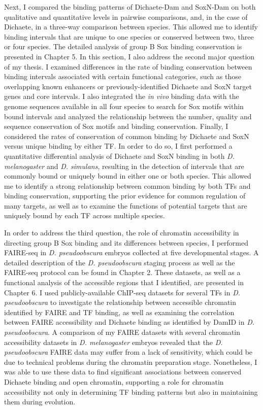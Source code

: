 Next, I compared the binding patterns of Dichaete-Dam and SoxN-Dam on both qualitative and quantitative levels in pairwise comparisons, and, in the case of Dichaete, in a three-way comparison between species. This allowed me to identify binding intervals that are unique to one species or conserved between two, three or four species. The detailed analysis of group B Sox binding conservation is presented in Chapter 5. In this section, I also address the second major question of my thesis. I examined differences in the rate of binding conservation between binding intervals associated with certain functional categories, such as those overlapping known enhancers or previously-identified Dichaete and SoxN target genes and core intervals. I also integrated the \emph{in vivo} binding data with the genome sequences available in all four species to search for Sox motifs within bound intervals and analyzed the relationship between the number, quality and sequence conservation of Sox motifs and binding conservation. Finally, I considered the rates of conservation of common binding by Dichaete and SoxN versus unique binding by either TF. In order to do so, I first performed a quantitative differential analysis of Dichaete and SoxN binding in both \emph{D. melanogaster} and \emph{D. simulans}, resulting in the detection of intervals that are commonly bound or uniquely bound in either one or both species. This allowed me to identify a strong relationship between common binding by both TFs and binding conservation, supporting the prior evidence for common regulation of many targets, as well as to examine the functions of potential targets that are uniquely bound by each TF across multiple species.

In order to address the third question, the role of chromatin accessibility in directing group B Sox binding and its differences between species, I performed FAIRE-seq in \emph{D. pseudoobscura} embryos collected at five developmental stages. A detailed description of the \emph{D. pseudoobscura} staging process as well as the FAIRE-seq protocol can be found in Chapter 2. These datasets, as well as a functional analysis of the accessible regions that I identified, are presented in Chapter 6. I used publicly-available ChIP-seq datasets for several TFs in \emph{D. pseudoobscura} to investigate the relationship between accessible chromatin identified by FAIRE and TF binding, as well as examining the correlation between FAIRE accessibility and Dichaete binding as identified by DamID in \emph{D. pseudoobscura}. A comparison of my FAIRE datasets with several chromatin accessibility datasets in \emph{D. melanogaster} embryos revealed that the \emph{D. pseudoobscura} FAIRE data may suffer from a lack of sensitivity, which could be due to technical problems during the chromatin preparation stage. Nonetheless, I was able to use these data to find significant associations between conserved Dichaete binding and open chromatin, supporting a role for chromatin accessibility not only in determining TF binding patterns but also in maintaining them during evolution.

